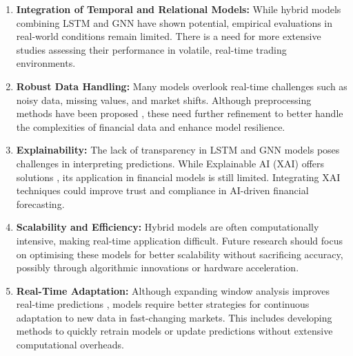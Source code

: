\begin{enumerate}
    \item \textbf{Integration of Temporal and Relational Models:} While hybrid models combining LSTM and GNN have shown potential, empirical evaluations in real-world conditions remain limited. There is a need for more extensive studies assessing their performance in volatile, real-time trading environments\citep{chen2018, shi2024}.

    \item \textbf{Robust Data Handling:} Many models overlook real-time challenges such as noisy data, missing values, and market shifts. Although preprocessing methods have been proposed \citep{bhanja2018, yeung2020}, these need further refinement to better handle the complexities of financial data and enhance model resilience.

    \item \textbf{Explainability:} The lack of transparency in LSTM and GNN models poses challenges in interpreting predictions. While Explainable AI (XAI) offers solutions \citep{kuiper2022}, its application in financial models is still limited. Integrating XAI techniques could improve trust and compliance in AI-driven financial forecasting.

    \item \textbf{Scalability and Efficiency:} Hybrid models are often computationally intensive, making real-time application difficult. Future research should focus on optimising these models for better scalability without sacrificing accuracy, possibly through algorithmic innovations or hardware acceleration.

    \item \textbf{Real-Time Adaptation:} Although expanding window analysis improves real-time predictions \citep{feng2024}, models require better strategies for continuous adaptation to new data in fast-changing markets. This includes developing methods to quickly retrain models or update predictions without extensive computational overheads.
\end{enumerate}